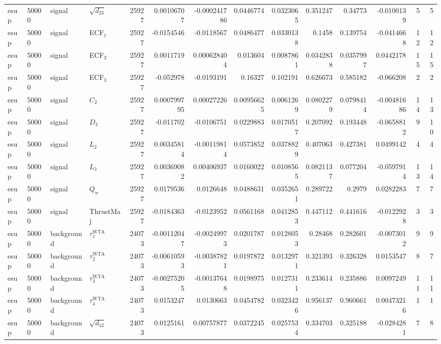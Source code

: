 \begin{landscape}
\begin{longtable}{llll r rrrr rr r rr}
esup & 50000 & signal & $\sqrt{d_{23}}$ & 25927 & 0.00106707 & -0.000241786 & 0.0446774 & 0.0323065 & 0.351247 & 0.34773 & -0.0100139 & 5 & 5 \\
esup & 50000 & signal & ECF$_1$ & 25927 & -0.0154546 & -0.0118567 & 0.0486477 & 0.0330138 & 0.1458 & 0.139754 & -0.0414668 & 12 & 12 \\
esup & 50000 & signal & ECF$_2$ & 25927 & 0.0011719 & 0.000628404 & 0.013604 & 0.0087861 & 0.0342838 & 0.0357997 & 0.0442178 & 15 & 15 \\
esup & 50000 & signal & ECF$_3$ & 25927 & -0.052978 & -0.0193191 & 0.16327 & 0.102191 & 0.626673 & 0.585182 & -0.066208 & 2 & 2 \\
esup & 50000 & signal & $C_2$ & 25927 & 0.000799795 & 0.00027226 & 0.00956625 & 0.0061269 & 0.0802279 & 0.0798414 & -0.00481686 & 14 & 13 \\
esup & 50000 & signal & $D_2$ & 25927 & -0.011702 & -0.0106751 & 0.0229883 & 0.0170517 & 0.207092 & 0.193448 & -0.0658812 & 9 & 10 \\
esup & 50000 & signal & $L_2$ & 25927 & 0.00345814 & -0.00119814 & 0.0573852 & 0.0378829 & 0.407063 & 0.427381 & 0.0499142 & 4 & 4 \\
esup & 50000 & signal & $L_3$ & 25927 & 0.00369082 & 0.00406937 & 0.0160022 & 0.0108565 & 0.0821137 & 0.077204 & -0.0597914 & 13 & 14 \\
esup & 50000 & signal & $Q_w$ & 25927 & 0.0179536 & 0.0126648 & 0.0488631 & 0.0352651 & 0.289722 & 0.2979 & 0.0282283 & 7 & 7 \\
esup & 50000 & signal & ThrustMaj & 25927 & -0.0184363 & -0.0123952 & 0.0561168 & 0.0412853 & 0.447112 & 0.441616 & -0.0122928 & 3 & 3 \\
esup & 50000 & background & $\tau_1^{\mathrm{WTA}}$ & 24073 & -0.00112047 & -0.00249973 & 0.0201787 & 0.0128053 & 0.28468 & 0.282601 & -0.0073012 & 9 & 9 \\
esup & 50000 & background & $\tau_2^{\mathrm{WTA}}$ & 24073 & -0.00610593 & -0.00387821 & 0.0197872 & 0.0132971 & 0.321393 & 0.326328 & 0.0153547 & 8 & 7 \\
esup & 50000 & background & $\tau_3^{\mathrm{WTA}}$ & 24073 & -0.00275205 & -0.00137648 & 0.0198975 & 0.0127311 & 0.233614 & 0.235886 & 0.0097249 & 11 & 11 \\
esup & 50000 & background & $\tau_4^{\mathrm{WTA}}$ & 24073 & 0.0153247 & 0.0130663 & 0.0454782 & 0.0323426 & 0.956137 & 0.960661 & 0.00473216 & 1 & 1 \\
esup & 50000 & background & $\sqrt{d_{12}}$ & 24073 & 0.0125161 & 0.00757877 & 0.0372245 & 0.0257534 & 0.334703 & 0.325188 & -0.0284281 & 7 & 8 \\

\end{longtable}
\end{landscape}
